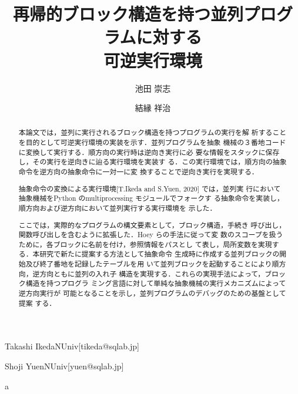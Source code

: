 \documentclass[submit,PRO]{ipsj}
\begin{document}
\title{再帰的ブロック構造を持つ並列プログラムに対する\\
      可逆実行環境}





\author{池田 崇志}{Takashi Ikeda}{NUniv}[tikeda@sqlab.jp]
\author{結縁 祥治}{Shoji Yuen}{NUniv}[yuen@sqlab.jp]


\begin{abstract}
本論文では，並列に実行されるブロック構造を持つプログラムの実行を解
析することを目的として可逆実行環境の実装を示す．並列プログラムを抽象
機械の３番地コードに変換して実行する．順方向の実行時は逆向き実行に必
要な情報をスタックに保存し，その実行を逆向きに辿る実行環境を実装す
る．この実行環境では，順方向の抽象命令を逆方向の抽象命令に一対一に変
換することで逆向き実行を実現する．

抽象命令の変換による実行環境[T.Ikeda and S.Yuen, 2020] では，並列実
行において抽象機械をPython のmultiprocessing モジュールでフォークす
る抽象命令を実装し，順方向および逆方向において並列実行する実行環境を
示した．

ここでは，実際的なプログラムの構文要素として，ブロック構造，手続き
呼び出し，関数呼び出しを含むように拡張した．Hoey らの手法に従って変
数のスコープを扱うために，各ブロックに名前を付け，参照情報をパスとし
て表し，局所変数を実現する．本研究で新たに提案する方法として抽象命令
生成時に作成する並列ブロックの開始及び終了番地を記録したテーブルを用
いて並列ブロックを起動することにより順方向，逆方向ともに並列の入れ子
構造を実現する．これらの実現手法によって，ブロック構造を持つプログラ
ミング言語に対して単純な抽象機械の実行メカニズムによって逆方向実行が
可能となることを示し，並列プログラムのデバッグのための基盤として提案
する．
\end{abstract}


\begin{jkeyword}
a
\end{jkeyword}
\end{document}
